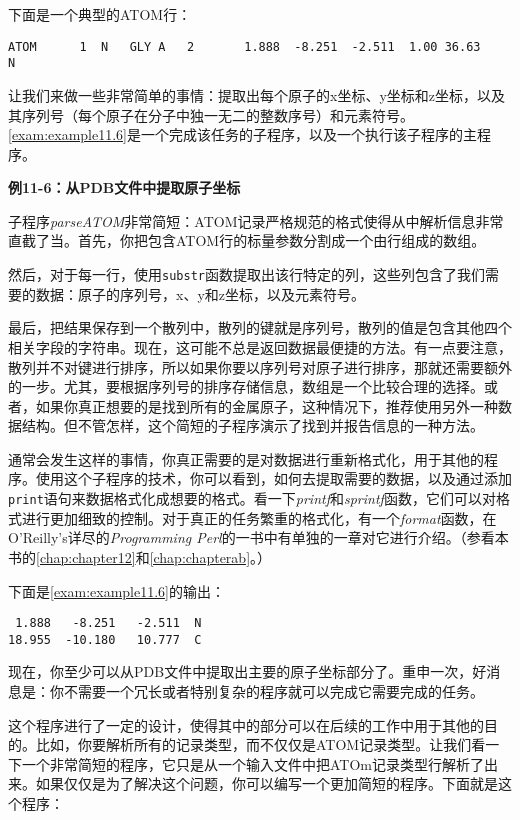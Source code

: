 下面是一个典型的ATOM行：

\begin{lstlisting}
ATOM      1  N   GLY A   2       1.888  -8.251  -2.511  1.00 36.63           N  
\end{lstlisting}

让我们来做一些非常简单的事情：提取出每个原子的x坐标、y坐标和z坐标，以及其序列号（每个原子在分子中独一无二的整数序号）和元素符号。\autoref{exam:example11.6}是一个完成该任务的子程序，以及一个执行该子程序的主程序。

\textbf{例11-6：从PDB文件中提取原子坐标}


子程序\textit{parseATOM}非常简短：ATOM记录严格规范的格式使得从中解析信息非常直截了当。首先，你把包含ATOM行的标量参数分割成一个由行组成的数组。

然后，对于每一行，使用\verb|substr|函数提取出该行特定的列，这些列包含了我们需要的数据：原子的序列号，x、y和z坐标，以及元素符号。

最后，把结果保存到一个散列中，散列的键就是序列号，散列的值是包含其他四个相关字段的字符串。现在，这可能不总是返回数据最便捷的方法。有一点要注意，散列并不对键进行排序，所以如果你要以序列号对原子进行排序，那就还需要额外的一步。尤其，要根据序列号的排序存储信息，数组是一个比较合理的选择。或者，如果你真正想要的是找到所有的金属原子，这种情况下，推荐使用另外一种数据结构。但不管怎样，这个简短的子程序演示了找到并报告信息的一种方法。

通常会发生这样的事情，你真正需要的是对数据进行重新格式化，用于其他的程序。使用这个子程序的技术，你可以看到，如何去提取需要的数据，以及通过添加\verb|print|语句来数据格式化成想要的格式。看一下\textit{printf}和\textit{sprintf}函数，它们可以对格式进行更加细致的控制。对于真正的任务繁重的格式化，有一个\textit{format}函数，在O'Reilly's详尽的\textit{Programming Perl}的一书中有单独的一章对它进行介绍。（参看本书的\autoref{chap:chapter12}和\autoref{chap:chapterab}。）

下面是\autoref{exam:example11.6}的输出：

\begin{lstlisting}
 1.888   -8.251   -2.511  N
18.955  -10.180   10.777  C
\end{lstlisting}

现在，你至少可以从PDB文件中提取出主要的原子坐标部分了。重申一次，好消息是：你不需要一个冗长或者特别复杂的程序就可以完成它需要完成的任务。

这个程序进行了一定的设计，使得其中的部分可以在后续的工作中用于其他的目的。比如，你要解析所有的记录类型，而不仅仅是ATOM记录类型。让我们看一下一个非常简短的程序，它只是从一个输入文件中把ATOm记录类型行解析了出来。如果仅仅是为了解决这个问题，你可以编写一个更加简短的程序。下面就是这个程序：

